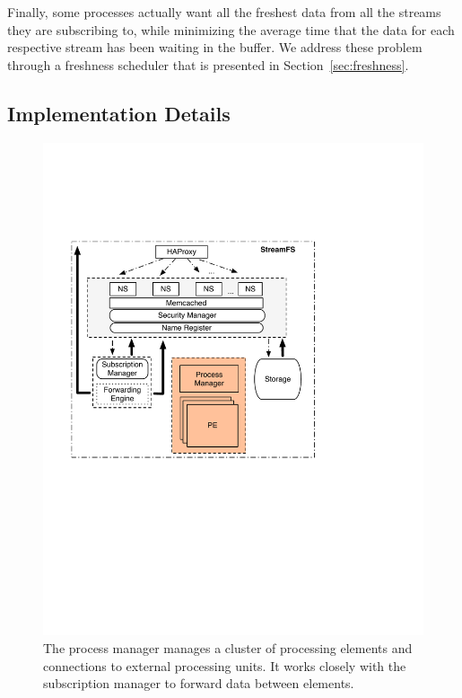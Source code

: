 
Finally, some processes actually want all the freshest
data from all the streams they are subscribing to, while minimizing the average time that the data for each respective stream has 
been waiting in the buffer.  We address these problem through a freshness scheduler that is presented in Section~\ref{sec:freshness}.



\subsection{Implementation Details}

\begin{figure}[h!] %
\centering
\includegraphics[width=.55\columnwidth]{figs/procmngr}
\caption{The process manager manages a cluster of processing elements and connections to external processing units.  It works
closely with the subscription manager to forward data between elements.}
\label{fig:procmngr}
\end{figure}


